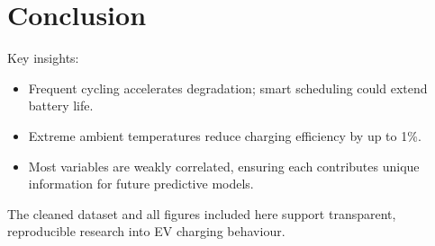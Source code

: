 \documentclass[11pt,a4paper]{article}
\begin{document}
\section{Conclusion}
Key insights:\begin{itemize}
 \item Frequent cycling accelerates degradation; smart scheduling could extend battery life. 
 \item Extreme ambient temperatures reduce charging efficiency by up to 1\%.
 \item Most variables are weakly correlated, ensuring each contributes unique information for future predictive models.
\end{itemize}

The cleaned dataset and all figures included here support transparent, reproducible research into EV charging behaviour.
\end{document}
